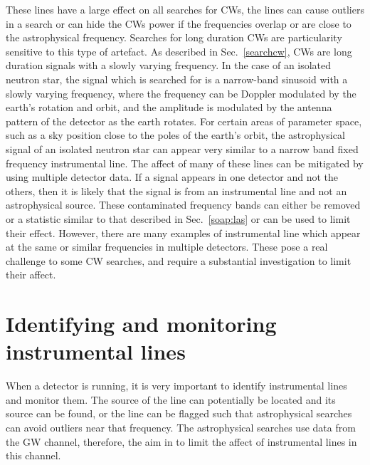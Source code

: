 %

These lines have a large effect on all searches for \glspl{CW}, the lines can cause outliers in a search or can hide the \glspl{CW} power if the frequencies overlap or are close to the astrophysical frequency.
Searches for long duration \glspl{CW} are particularity sensitive to this type of artefact.  As described in
Sec.~\ref{searchcw}, \glspl{CW} are long duration signals with a slowly varying
frequency.  In the case of an isolated neutron star, the signal which is
searched for is a narrow-band sinusoid with a slowly varying frequency, where the frequency can be Doppler modulated by
the earth's rotation and orbit, and the amplitude is modulated by the antenna pattern of the detector as the earth rotates. For certain areas of parameter space, such as a sky position
close to the poles of the earth's orbit, the astrophysical signal of an isolated neutron star can
appear very similar to a narrow band fixed frequency instrumental line. The affect of many of these lines can be mitigated by using multiple detector data. If a signal
appears in one detector and not the others, then it is likely that the signal
is from an instrumental line and not an astrophysical source.  These
contaminated frequency bands can either be removed or a statistic similar to
that described in Sec.~\ref{soap:las} or \citep{keitel2014SearchContinuous} can
be used to limit their effect.  However, there are many examples of
instrumental line which appear at the same or similar frequencies in multiple
detectors.  These pose a real challenge to some \gls{CW} searches, and require
a substantial investigation to limit their affect.

\section{\label{detchar:monitor}Identifying and monitoring instrumental lines}
%

When a detector is running, it is very important to identify instrumental lines
and monitor them.  The source of the line can potentially be located and its source can be found, or the line can be flagged such that astrophysical searches can avoid outliers near that frequency.  
The astrophysical searches use data from the \gls{GW} channel, therefore, the aim in to limit the affect of instrumental lines in this channel.

